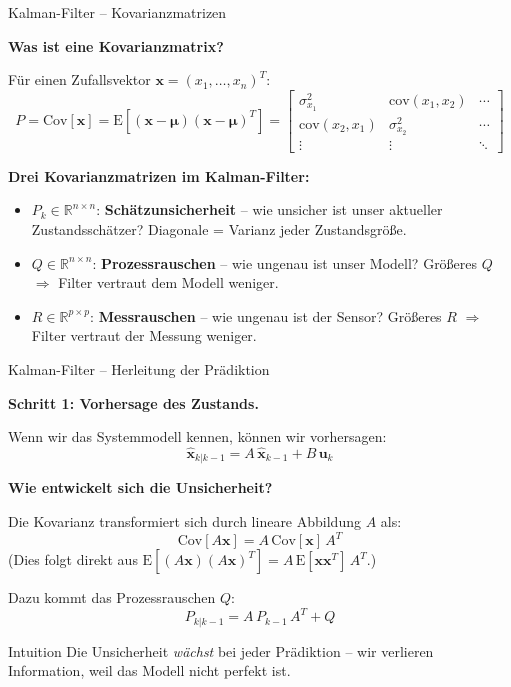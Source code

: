 \documentclass[%
  aspectratio=169,
  10pt
]{beamer}
\newcommand{\hl}[1]{{\color{fbblau}\textbf{#1}}}
\newcommand{\R}{\mathbb{R}}
\begin{document}
\begin{frame}{Kalman-Filter -- Kovarianzmatrizen}

\textbf{Was ist eine Kovarianzmatrix?}

Für einen Zufallsvektor $\mathbf{x} = (x_1, \ldots, x_n)^T$:
\[
  P = \mathrm{Cov}[\mathbf{x}] = \mathrm{E}[(\mathbf{x} - \bm{\mu})(\mathbf{x} - \bm{\mu})^T]
  = \begin{bmatrix}
    \sigma_{x_1}^2 & \mathrm{cov}(x_1,x_2) & \cdots \\
    \mathrm{cov}(x_2,x_1) & \sigma_{x_2}^2 & \cdots \\
    \vdots & \vdots & \ddots
  \end{bmatrix}
\]

\vspace{1mm}
\textbf{Drei Kovarianzmatrizen im Kalman-Filter:}

\begin{itemize}
  \item $P_k \in \R^{n\times n}$: \hl{Schätzunsicherheit} --
        wie unsicher ist unser aktueller Zustandsschätzer?
        Diagonale = Varianz jeder Zustandsgröße.
  \item $Q \in \R^{n\times n}$: \hl{Prozessrauschen} --
        wie ungenau ist unser Modell?
        Größeres $Q$ $\Rightarrow$ Filter vertraut dem Modell weniger.
  \item $R \in \R^{p\times p}$: \hl{Messrauschen} --
        wie ungenau ist der Sensor?
        Größeres $R$ $\Rightarrow$ Filter vertraut der Messung weniger.
\end{itemize}

\end{frame}


\begin{frame}{Kalman-Filter -- Herleitung der Prädiktion}

\textbf{Schritt 1: Vorhersage des Zustands.}

Wenn wir das Systemmodell kennen, können wir vorhersagen:
\[
  \hat{\mathbf{x}}_{k|k-1} = A\,\hat{\mathbf{x}}_{k-1} + B\,\mathbf{u}_k
\]

\textbf{Wie entwickelt sich die Unsicherheit?}

\pause
Die Kovarianz transformiert sich durch lineare Abbildung $A$ als:
\[
  \mathrm{Cov}[A\mathbf{x}] = A\,\mathrm{Cov}[\mathbf{x}]\,A^T
\]
(Dies folgt direkt aus $\mathrm{E}[(A\mathbf{x})(A\mathbf{x})^T] = A\,\mathrm{E}[\mathbf{x}\mathbf{x}^T]\,A^T$.)

\pause
Dazu kommt das Prozessrauschen $Q$:
\[
  \boxed{P_{k|k-1} = A\,P_{k-1}\,A^T + Q}
\]

\begin{alertblock}{Intuition}
  Die Unsicherheit \emph{wächst} bei jeder Prädiktion -- wir verlieren
  Information, weil das Modell nicht perfekt ist.
\end{alertblock}

\end{frame}
\end{document}
